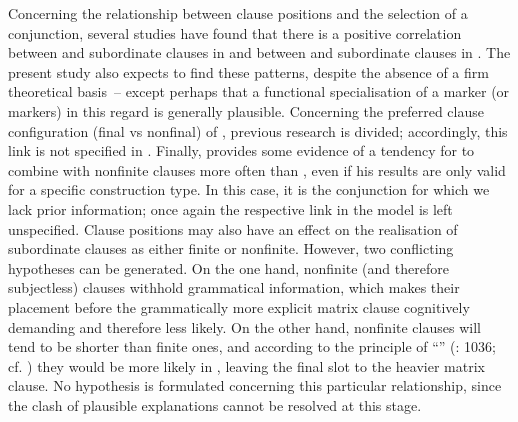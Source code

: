 Concerning the relationship between clause positions and the selection of a conjunction, several studies have found that there is a positive correlation between  and subordinate clauses in  and between  and subordinate clauses in . The present study also expects to find these patterns, despite the absence of a firm theoretical basis~– except perhaps that a functional specialisation of a marker (or markers) in this regard is generally plausible. Concerning the preferred clause configuration (final vs nonfinal) of , previous research is divided; accordingly, this link is not specified in . Finally, \citet{Hilpert2013a} provides some evidence of a tendency for  to combine with nonfinite clauses more often than , even if his results are only valid for a specific construction type. In this case, it is the conjunction  for which we lack prior information; once again the respective link in the model is left unspecified. Clause positions may also have an effect on the realisation of subordinate clauses as either finite or nonfinite. However, two conflicting hypotheses can be generated. On the one hand, nonfinite (and therefore subjectless) clauses withhold grammatical information, which makes their placement before the grammatically more explicit matrix clause cognitively demanding and therefore less likely. On the other hand, nonfinite clauses will tend to be shorter than finite ones, and according to the principle of “” (\citealt{QuirkEtAl1985}: 1036; cf. ) they would be more likely in , leaving the final slot to the heavier matrix clause. No hypothesis is formulated concerning this particular relationship, since the clash of plausible explanations cannot be resolved at this stage.

